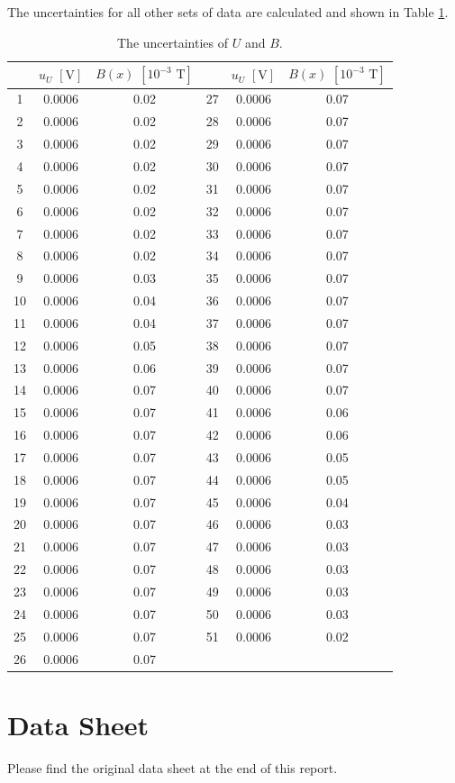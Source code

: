 \documentclass{article}
\begin{document}
The uncertainties for all other sets of data are calculated and shown in Table \ref{TableUncUB}.

\begin{table}[htbp]
\centering
\begin{tabular}{ccc||ccc}
\toprule
& $u_U\,\,[\text{V}]$ & $B(x)\,\,[10^{-3}\,\,\text{T}]$ & &  $u_U\,\,[\text{V}]$ & $B(x)\,\,[10^{-3}\,\,\text{T}]$\\
\midrule
    1     & 0.0006 & 0.02 & 27    & 0.0006 & 0.07 \\
    2     & 0.0006 & 0.02 & 28    & 0.0006 & 0.07 \\
    3     & 0.0006 & 0.02 & 29    & 0.0006 & 0.07 \\
    4     & 0.0006 & 0.02 & 30    & 0.0006 & 0.07 \\
    5     & 0.0006 & 0.02 & 31    & 0.0006 & 0.07 \\
    6     & 0.0006 & 0.02 & 32    & 0.0006 & 0.07 \\
    7     & 0.0006 & 0.02 & 33    & 0.0006 & 0.07 \\
    8     & 0.0006 & 0.02 & 34    & 0.0006 & 0.07 \\
    9     & 0.0006 & 0.03 & 35    & 0.0006 & 0.07 \\
    10    & 0.0006 & 0.04 & 36    & 0.0006 & 0.07 \\
    11    & 0.0006 & 0.04 & 37    & 0.0006 & 0.07 \\
    12    & 0.0006 & 0.05 & 38    & 0.0006 & 0.07 \\
    13    & 0.0006 & 0.06 & 39    & 0.0006 & 0.07 \\
    14    & 0.0006 & 0.07 & 40    & 0.0006 & 0.07 \\
    15    & 0.0006 & 0.07 & 41    & 0.0006 & 0.06 \\
    16    & 0.0006 & 0.07 & 42    & 0.0006 & 0.06 \\
    17    & 0.0006 & 0.07 & 43    & 0.0006 & 0.05 \\
    18    & 0.0006 & 0.07 & 44    & 0.0006 & 0.05 \\
    19    & 0.0006 & 0.07 & 45    & 0.0006 & 0.04 \\
    20    & 0.0006 & 0.07 & 46    & 0.0006 & 0.03 \\
    21    & 0.0006 & 0.07 & 47    & 0.0006 & 0.03 \\
    22    & 0.0006 & 0.07 & 48    & 0.0006 & 0.03 \\
    23    & 0.0006 & 0.07 & 49    & 0.0006 & 0.03 \\
    24    & 0.0006 & 0.07 & 50    & 0.0006 & 0.03 \\
    25    & 0.0006 & 0.07 & 51    & 0.0006 & 0.02 \\
    26    & 0.0006 & 0.07 \\
\bottomrule
\end{tabular}
\caption{The uncertainties of $U$ and $B$.}\label{TableUncUB}
\end{table}



\newpage



		\section{Data Sheet}
	
Please find the original data sheet at the end of this report.


\end{document}
